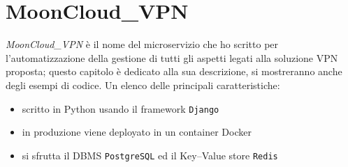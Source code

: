 \chapter{MoonCloud\_VPN}\label{ch:microservice}
\textit{MoonCloud\_VPN} è il nome del microservizio
che ho scritto per l'automatizzazione della gestione di tutti gli aspetti legati
alla soluzione VPN proposta; questo capitolo è dedicato alla sua descrizione, si
mostreranno anche degli esempi di codice.
Un elenco delle principali caratteristiche:
\begin{itemize}
  \item scritto in Python usando il framework \texttt{Django}
  \item in produzione viene deployato in un container Docker
  \item si sfrutta il DBMS \texttt{PostgreSQL} ed il Key--Value store \texttt{Redis}
\end{itemize}






